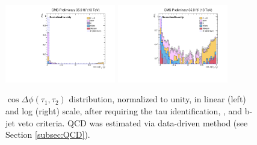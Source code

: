 
  \begin{figure}[H]
 \begin{center}
 \captionsetup[subfloat]{farskip=0pt,captionskip=0.0cm,labelformat=empty}
 \includegraphics[clip,width=0.43\textwidth]{figuras/Chapter5/TauID_Plots/EventSelection_cosDphi.pdf}
 \includegraphics[clip,width=0.43\textwidth]{figuras/Chapter5/TauID_Plots/EventSelection_cosDphi_log.pdf}
 \end{center}
 \caption{$\cos\Delta \phi (\tau_{1},\tau_{2})$ distribution, normalized to unity, in linear (left) and log (right) scale, after requiring
 the tau identification, \MET, and b-jet veto criteria. QCD was estimated via data-driven method (see Section \ref{subsec:QCD}).}
 \label{cosDphi}
 \end{figure}

